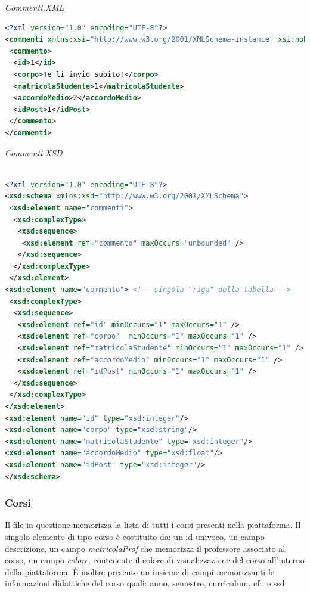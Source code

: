 \documentclass [a4paper,11pt]{book}
\begin{document}
\medskip

\emph{Commenti.XML}

\label{sec:commenti}

\begin{lstlisting}[language=XML]
<?xml version="1.0" encoding="UTF-8"?>
<commenti xmlns:xsi="http://www.w3.org/2001/XMLSchema-instance" xsi:noNamespaceSchemaLocation="commenti.xsd">
 <commento>
  <id>1</id>
  <corpo>Te li invio subito!</corpo>
  <matricolaStudente>1</matricolaStudente>
  <accordoMedio>2</accordoMedio>
  <idPost>1</idPost>
 </commento>
</commenti>
\end{lstlisting}

\medskip

\emph{Commenti.XSD}

\begin{lstlisting}[language=XML]

<?xml version="1.0" encoding="UTF-8"?>
<xsd:schema xmlns:xsd="http://www.w3.org/2001/XMLSchema">
 <xsd:element name="commenti">
  <xsd:complexType>
   <xsd:sequence>
    <xsd:element ref="commento" maxOccurs="unbounded" />
   </xsd:sequence>
  </xsd:complexType>
 </xsd:element>
<xsd:element name="commento"> <!-- singola "riga" della tabella -->
 <xsd:complexType>
  <xsd:sequence>
   <xsd:element ref="id" minOccurs="1" maxOccurs="1" />
   <xsd:element ref="corpo"  minOccurs="1" maxOccurs="1" />
   <xsd:element ref="matricolaStudente" minOccurs="1" maxOccurs="1" />
   <xsd:element ref="accordoMedio" minOccurs="1" maxOccurs="1" />
   <xsd:element ref="idPost" minOccurs="1" maxOccurs="1" />
  </xsd:sequence>   
 </xsd:complexType>
</xsd:element>
<xsd:element name="id" type="xsd:integer"/>
<xsd:element name="corpo" type="xsd:string"/>
<xsd:element name="matricolaStudente" type="xsd:integer"/>
<xsd:element name="accordoMedio" type="xsd:float"/>
<xsd:element name="idPost" type="xsd:integer"/>
</xsd:schema>
\end{lstlisting}

\medskip

\subsubsection{Corsi}

Il file in questione memorizza la lista di tutti i corsi presenti nella piattaforma. Il singolo elemento di tipo corso è costituito da: un id univoco, un campo descrizione, un campo \emph{matricolaProf} che memorizza il professore associato al corso, un campo \emph{colore}, contenente il colore di visualizzazione del corso all'interno della piattaforma. È inoltre presente un insieme di campi memorizzanti le informazioni didattiche del corso quali: anno, semestre, curriculum, cfu e ssd.
\end{document}
